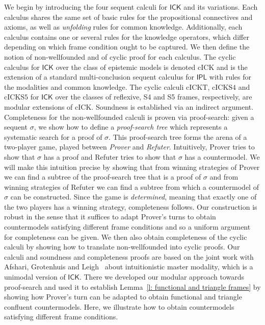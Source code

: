 \documentclass{myifcolog}
\newcommand{\ICK}{\mathsf{ICK}}
\newcommand{\cick}{\mathrm{cICK}}
\newcommand{\cickt}{\mathrm{cICKT}}
\newcommand{\cicks}{\mathrm{cICKS4}}
\newcommand{\cickss}{\mathrm{cICKS5}}
\numberwithin{theorem}{section}
\begin{document}
We begin by introducing the four sequent calculi for $\ICK$ and its variations. Each calculus shares the same set of basic rules for the propositional connectives and axioms, as well as \emph{unfolding} rules for common knowledge. Additionally, each calculus contains one or several rules for the knowledge operators, which differ depending on which frame condition ought to be captured. We then define the notion of non-wellfounded and of cyclic proof for each calculus. The cyclic calculus for $\ICK$ over the class of epistemic models is denoted $\cick$ and is the extension of a standard multi-conclusion sequent calculus for $\mathsf{IPL}$ with rules for the modalities and common knowledge. The cyclic calculi $\cickt$, $\cicks$ and $\cickss$ for $\ICK$ over the classes of reflexive, S4 and S5 frames, respectively, are modular extensions of $\cick$. Soundness is established via an indirect argument. Completeness for the non-wellfounded calculi is proven via proof-search: given a sequent $\sigma$, we show how to define a \emph{proof-search tree} which represents a systematic search for a proof of $\sigma$. This proof-search tree forms the arena of a two-player game, played between \emph{Prover} and \emph{Refuter}. Intuitively, Prover tries to show that $\sigma$ has a proof and Refuter tries to show that $\sigma$ has a countermodel. We will make this intuition precise by showing that from winning strategies of Prover we can find a subtree of the proof-search tree that is a proof of $\sigma$ and from winning strategies of Refuter we can find a subtree from which a countermodel of $\sigma$ can be constructed. Since the game is \emph{determined}, meaning that exactly one of the two players has a winning strategy, completeness follows. Our construction is robust in the sense that it suffices to adapt Prover's turns to obtain countermodels satisfying different frame conditions and so a uniform argument for completeness can be given. We then also obtain completeness of the cyclic calculi by showing how to translate non-wellfounded into cyclic proofs. Our calculi and soundness and completeness proofs are based on the joint work with Afshari, Grotenhuis and Leigh~\cite{afshari_intuitionistic_2024} about intuitionistic master modality, which is a unimodal version of $\ICK$. There we developed our modular approach towards proof-search and used it to establish Lemma~\ref{l: functional and triangle frames} by showing how Prover's turn can be adapted to obtain functional and triangle confluent countermodels. Here, we illustrate how to obtain countermodels satisfying different frame conditions.
\end{document}
